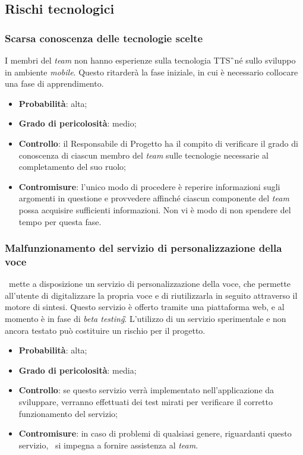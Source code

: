 \subsection{Rischi tecnologici}

\subsubsection{Scarsa conoscenza delle tecnologie scelte}
\label{sec:ScarsTec}
I membri del \textit{team} non hanno esperienze sulla tecnologia TTS\G\ né sullo sviluppo in ambiente \textit{mobile}. Questo ritarderà la fase iniziale, in cui è necessario collocare una fase di apprendimento.
\begin{itemize}
\item \textbf{Probabilità}: alta;
\item \textbf{Grado di pericolosità}: medio;
\item \textbf{Controllo}: il Responsabile di Progetto ha il compito di verificare il grado di conoscenza di ciascun membro del \textit{team} sulle tecnologie necessarie al completamento del suo ruolo;
\item \textbf{Contromisure}: l'unico modo di procedere è reperire informazioni sugli argomenti in questione e provvedere affinché ciascun componente del \textit{team} possa acquisire sufficienti informazioni. Non vi è modo di non spendere del tempo per questa fase.
\end{itemize}

\subsubsection{Malfunzionamento del servizio di personalizzazione della voce}
\label{sec:PMalf}
\AZIENDA\ mette a disposizione un servizio di personalizzazione della voce, che 
permette all'utente di digitalizzare la propria voce e di riutilizzarla in seguito 
attraverso il motore di sintesi. Questo servizio è offerto tramite una piattaforma 
web, e al momento è in fase di \textit{beta testing}\G. L'utilizzo di un 
servizio sperimentale e non ancora testato può costituire un rischio per il 
progetto.
\begin{itemize}
\item \textbf{Probabilità}: alta;
\item \textbf{Grado di pericolosità}: media;
\item \textbf{Controllo}: se questo servizio verrà implementato nell'applicazione 
da sviluppare, verranno effettuati dei test mirati per verificare il corretto funzionamento del servizio;
\item \textbf{Contromisure}: in caso di problemi di qualsiasi genere, 
riguardanti questo servizio, \AZIENDA\ si impegna a fornire assistenza al 
\textit{team}. 
\end{itemize} 

